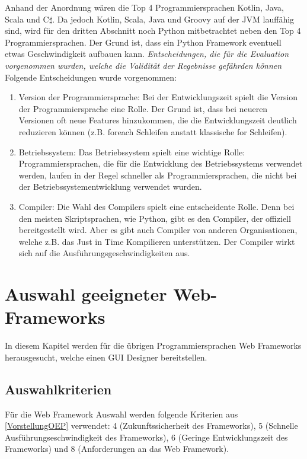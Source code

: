 \documentclass[ngerman]{article}
\begin{document}
    Anhand der Anordnung wären die Top 4 Programmiersprachen Kotlin, Java, Scala und C$\sharp$. Da jedoch Kotlin, Scala, Java und Groovy auf der JVM lauffähig sind, wird für den dritten Abschnitt noch Python mitbetrachtet neben den Top 4 Programmiersprachen. Der Grund ist, dass ein Python Framework eventuell etwas Geschwindigkeit aufbauen kann.
    \textit{Entscheidungen, die für die Evaluation vorgenommen wurden, welche die Validität der Regebnisse gefährden können}\\
    Folgende Entscheidungen wurde vorgenommen:
    \begin{enumerate}
        \item Version der Programmiersprache: Bei der Entwicklungszeit spielt die Version der Programmiersprache eine Rolle. Der Grund ist, dass bei neueren Versionen oft neue Features hinzukommen, die die Entwicklungszeit deutlich reduzieren können (z.B. foreach Schleifen anstatt klassische for Schleifen).
        \item Betriebssystem: Das Betriebssystem spielt eine wichtige Rolle: Programmiersprachen, die für die Entwicklung des Betriebssystems verwendet werden, laufen in der Regel schneller als Programmiersprachen, die nicht bei der Betriebssystementwicklung verwendet wurden.
        \item Compiler: Die Wahl des Compilers spielt eine entscheidente Rolle. Denn bei den meisten Skriptsprachen, wie Python, gibt es den Compiler, der offiziell bereitgestellt wird. Aber es gibt auch Compiler von anderen Organisationen, welche z.B. das Just in Time Kompilieren unterstützen. Der Compiler wirkt sich auf die Ausführungsgeschwindigkeiten aus.
    \end{enumerate}
    \newpage\noindent
    \section{Auswahl geeigneter Web-Frameworks}
    \label{AuswahlFrameworks}
    In diesem Kapitel werden für die übrigen Programmiersprachen Web Frameworks herausgesucht, welche einen GUI Designer bereitstellen.
    \subsection{Auswahlkriterien}
    Für die Web Framework Auswahl werden folgende Kriterien aus \ref{VorstellungOEP} verwendet: 4 (Zukunftssicherheit des Frameworks), 5 (Schnelle Ausführungseschwindigkeit des Frameworks), 6 (Geringe Entwicklungszeit des Frameworks) und 8 (Anforderungen an das Web Framework).
\end{document}
